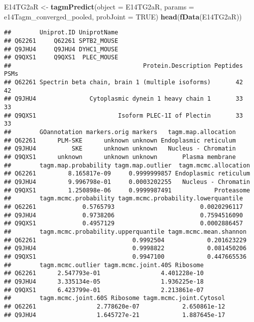 \documentclass[9pt,a4paper,]{extarticle}
\newenvironment{Shaded}{\begin{snugshade}}{\end{snugshade}}
\newcommand{\DataTypeTok}[1]{\textcolor[rgb]{0.13,0.29,0.53}{#1}}
\newcommand{\KeywordTok}[1]{\textcolor[rgb]{0.13,0.29,0.53}{\textbf{#1}}}
\newcommand{\NormalTok}[1]{#1}
\newcommand{\OtherTok}[1]{\textcolor[rgb]{0.56,0.35,0.01}{#1}}
\newcommand{\StringTok}[1]{\textcolor[rgb]{0.31,0.60,0.02}{#1}}
\begin{document}
\begin{Shaded}
\begin{Highlighting}[]
\NormalTok{E14TG2aR <-}\StringTok{ }\KeywordTok{tagmPredict}\NormalTok{(}\DataTypeTok{object =}\NormalTok{ E14TG2aR,}
                        \DataTypeTok{params =}\NormalTok{ e14Tagm_converged_pooled,}
                        \DataTypeTok{probJoint =} \OtherTok{TRUE}\NormalTok{)}
\KeywordTok{head}\NormalTok{(}\KeywordTok{fData}\NormalTok{(E14TG2aR))}
\end{Highlighting}
\end{Shaded}

\begin{verbatim}
##        Uniprot.ID UniprotName
## Q62261     Q62261 SPTB2_MOUSE
## Q9JHU4     Q9JHU4 DYHC1_MOUSE
## Q9QXS1     Q9QXS1  PLEC_MOUSE
##                                     Protein.Description Peptides PSMs
## Q62261 Spectrin beta chain, brain 1 (multiple isoforms)       42   42
## Q9JHU4               Cytoplasmic dynein 1 heavy chain 1       33   33
## Q9QXS1                       Isoform PLEC-1I of Plectin       33   33
##        GOannotation markers.orig markers   tagm.map.allocation
## Q62261      PLM-SKE      unknown unknown Endoplasmic reticulum
## Q9JHU4          SKE      unknown unknown   Nucleus - Chromatin
## Q9QXS1      unknown      unknown unknown       Plasma membrane
##        tagm.map.probability tagm.map.outlier  tagm.mcmc.allocation
## Q62261         8.165817e-09     0.9999999857 Endoplasmic reticulum
## Q9JHU4         9.996798e-01     0.0003202255   Nucleus - Chromatin
## Q9QXS1         1.250898e-06     0.9999987491            Proteasome
##        tagm.mcmc.probability tagm.mcmc.probability.lowerquantile
## Q62261             0.5765793                        0.0020296117
## Q9JHU4             0.9738206                        0.7594516090
## Q9QXS1             0.4957129                        0.0002886457
##        tagm.mcmc.probability.upperquantile tagm.mcmc.mean.shannon
## Q62261                           0.9992504            0.201623229
## Q9JHU4                           0.9998822            0.081450206
## Q9QXS1                           0.9947100            0.447665536
##        tagm.mcmc.outlier tagm.mcmc.joint.40S Ribosome
## Q62261      2.547793e-01                 4.401228e-10
## Q9JHU4      3.335134e-05                 1.936225e-18
## Q9QXS1      6.423799e-01                 2.213861e-07
##        tagm.mcmc.joint.60S Ribosome tagm.mcmc.joint.Cytosol
## Q62261                 2.778620e-07            2.650861e-12
## Q9JHU4                 1.645727e-21            1.887645e-17

\end{verbatim}
\end{document}
